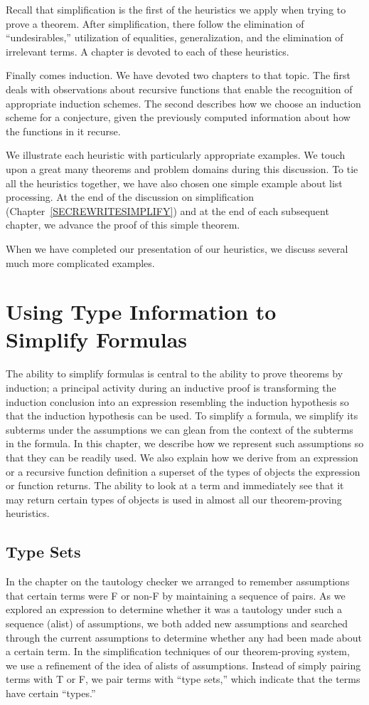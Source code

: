 \documentclass[11pt]{book}
\newcommand{\pubdefaulttextsize}{\large}
\begin{document}
Recall that simplification is the first
of the heuristics
we apply when trying to prove a theorem.  After simplification, there follow the elimination
of ``undesirables,'' utilization of equalities, generalization, and the elimination
of irrelevant terms.  A chapter is devoted to each of
these heuristics.

Finally comes induction.  We have devoted two chapters
to that topic.  The first deals with observations about recursive functions
that enable the recognition of appropriate induction schemes.
The second
describes how we choose
an induction scheme for a conjecture, given the previously computed information
about how the functions in it recurse.

We illustrate each heuristic with particularly appropriate examples.
We touch upon a great many theorems and problem domains
during this discussion.  To tie all the heuristics together, we have also
chosen one simple example about list processing.
At the end of the discussion on simplification (Chapter~\ref{SECREWRITESIMPLIFY}) and 
at the end of each subsequent chapter, we  advance the
proof of this simple theorem.

When we have completed our presentation of our heuristics, we 
discuss several much more complicated examples.
\chapter{Using Type Information to Simplify Formulas}
\label{SECTYPESET}
\pubdefaulttextsize
The ability to simplify formulas is central to the
ability to prove theorems by induction; a
principal activity during an inductive proof is transforming the
induction conclusion into an expression resembling the induction
hypothesis so that the induction hypothesis can be used.
To simplify a formula, we simplify its subterms
under the  assumptions we can glean from the context of
the subterms in the formula.  In this chapter, we
describe how we represent such assumptions so that they
can be readily used.
We also explain how we derive from an expression or a
recursive function definition a superset of the types of
objects the expression or function returns.  The ability to look
at a term and immediately see that it may return certain
types of objects is used in almost all our theorem-proving
heuristics.
\section{Type Sets}
\pubdefaulttextsize
In the chapter on the tautology checker
we arranged to remember assumptions that certain terms
were F or non-F by maintaining a sequence of pairs.  As we explored
an expression to determine whether it was a tautology under such
a sequence (alist) of assumptions,
we both added new assumptions and searched through the
current assumptions  to determine whether any 
had been made about a certain term.  In the  simplification
techniques of our theorem-proving system,
we use a refinement of the idea of alists of assumptions.
Instead of simply pairing terms with 
T or F, we pair terms with ``type sets,'' 
which indicate that the terms have certain ``types.''
\end{document}
